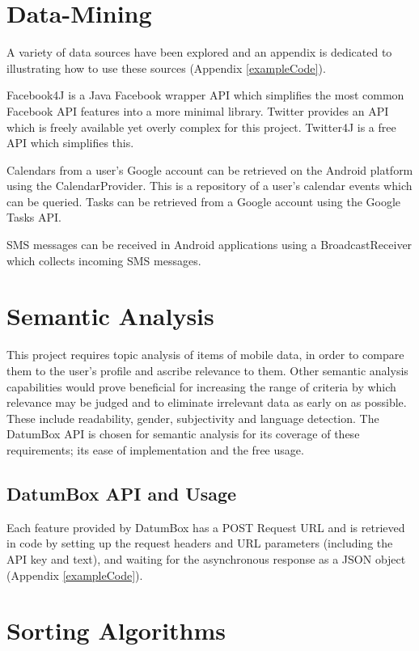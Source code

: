 \section{Data-Mining}

A variety of data sources have been explored and an appendix is dedicated to illustrating how to use these sources  (Appendix \ref{exampleCode}).

Facebook4J \cite{Facebook4JExample} is a Java Facebook wrapper API which simplifies the most common Facebook API features into a more minimal library. Twitter provides an API which is freely available yet overly complex for this project. Twitter4J \cite{Twitter4JExample} is a free API which simplifies this.

Calendars from a user's Google account can be retrieved on the Android platform using the CalendarProvider. This is a repository of a user's calendar events which can be queried. Tasks can be retrieved from a Google account using the Google Tasks API.

SMS messages can be received in Android applications using a BroadcastReceiver which collects incoming SMS messages.

\section{Semantic Analysis}

This project requires topic analysis of items of mobile data, in order to compare them to the user's profile and ascribe relevance to them. Other semantic analysis capabilities would prove beneficial for increasing the range of criteria by which relevance may be judged and to eliminate irrelevant data as early on as possible. These include readability, gender, subjectivity and language detection. The DatumBox \cite{DatumBox} API is chosen for semantic analysis for its coverage of these requirements; its ease of implementation and the free usage. 

\subsection{DatumBox API and Usage}

Each feature provided by DatumBox has a POST Request URL and is retrieved in code by setting up the request headers and URL parameters (including the API key and text), and waiting for the asynchronous response as a JSON object (Appendix \ref{exampleCode}).

\section{Sorting Algorithms}

